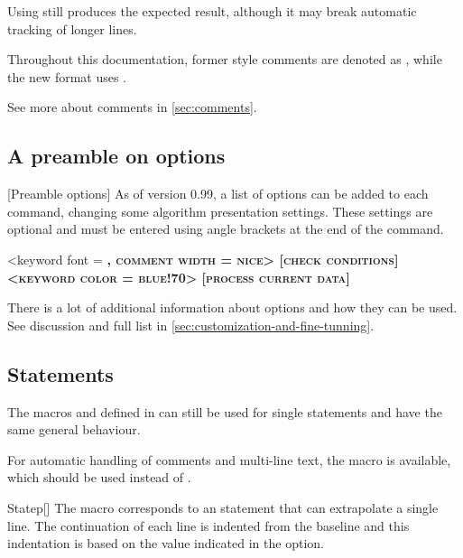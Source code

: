 \documentclass[a4paper, 11pt]{article}
\begin{document}
Using  still produces the expected result, although it may break automatic tracking of longer lines.

Throughout this documentation, former style comments are denoted as , while the new format uses .

See more about comments in \cref{sec:comments}.

\subsection{A preamble on options}\label{sec:a-preamble-on-options}
[Preamble options]%
As of version 0.99, a list of options can be added to each command, changing some algorithm presentation settings. These settings are optional and must be entered using angle brackets at the end of the command.

\begin{tcblisting}{}
    \begin{algorithmic}<keyword font = \scshape\bfseries, comment width = nice>
        [check conditions]
            <keyword color = blue!70>
                [process current data]
            \EndWhile
        \EndIf
    \end{algorithmic}
\end{tcblisting}

There is a lot of additional information about options and how they can be used. See discussion and full list in \cref{sec:customization-and-fine-tunning}.

\subsection{Statements}\label{sec:statements}

The macros  and  defined in  can still be used for single statements and have the same general behaviour.

For automatic handling of comments and multi-line text, the  macro is available, which should be used instead of .

\begin{macro}{Statep}[]
    The  macro corresponds to an statement that can extrapolate a single line. The continuation of each line is indented from the baseline and this indentation is based on the value indicated in the  option.

    \MacroOptionsText
\end{macro}
\end{document}
